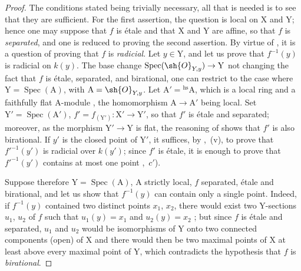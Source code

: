
\begin{proof}
The conditions stated being trivially necessary, all that is needed is to see that they are sufficient.
For the first assertion, the question is local on $\mathrm{X}$ and $\mathrm{Y}$; hence one may suppose that $f$ is \'etale and that $\mathrm{X}$ and $\mathrm{Y}$ are affine, so that $f$ is \emph{separated}, and one is reduced to proving the second assertion.
By virtue of , it is a question of proving that $f$ is \emph{radicial}.
Let $y\in\mathrm{Y}$, and let us prove that $f^{-1}(y)$ is radicial on $k(y)$.
The base change $\operatorname{Spec}(\sh{O}_{Y,y})\to\mathrm{Y}$ not changing the fact that $f$ is \'etale, separated, and birational, one can restrict to the case where $\mathrm{Y}=\operatorname{Spec}(\mathrm{A})$, with $\mathrm{A}=\sh{O}_{Y,y}$.
Let $\mathrm{A}'={}^{\mathrm{hs}}\mathrm{A}$, which is a local ring and a faithfully flat $\mathrm{A}$-module , the homomorphism $\mathrm{A}\to\mathrm{A}'$ being local.
Set $\mathrm{Y}'=\operatorname{Spec}(\mathrm{A}')$, $f'=f_{(\mathrm{Y}')}:\mathrm{X}'\to\mathrm{Y}'$, so that $f'$ is \'etale and separated; moreover, as the morphism $\mathrm{Y}'\to\mathrm{Y}$ is flat, the reasoning of  shows that $f'$ is also birational.
If $y'$ is the closed point of $\mathrm{Y}'$, it suffices, by ,~(v), to prove that $f'^{-1}(y')$ is radicial over $k(y')$; since $f'$ is \'etale, it is enough to prove that $f'^{-1}(y')$ contains at most one point ,~$c'$).

Suppose therefore $\mathrm{Y}=\operatorname{Spec}(\mathrm{A})$, $\mathrm{A}$ strictly local, $f$ separated, \'etale and birational, and let us show that $f^{-1}(y)$ can contain only a single point.
Indeed, if $f^{-1}(y)$ contained two distinct points $x_1$, $x_2$, there would exist two $\mathrm{Y}$-sections $u_1$, $u_2$ of $f$ such that $u_1(y)=x_1$ and $u_2(y)=x_2$ ; but since $f$ is \'etale and separated, $u_1$ and $u_2$ would be isomorphisms of $\mathrm{Y}$ onto two connected components (open) of $\mathrm{X}$  and there would then be two maximal points of $\mathrm{X}$ at least above every maximal point of $\mathrm{Y}$, which contradicts the hypothesis that $f$ is \emph{birational}.
\end{proof}

